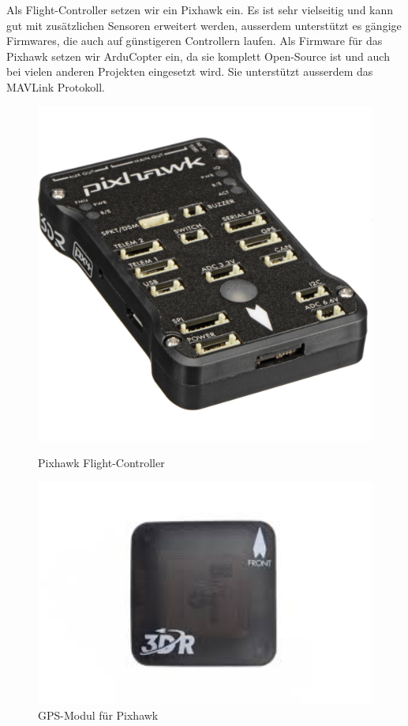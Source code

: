 Als Flight-Controller setzen wir ein Pixhawk ein. Es ist sehr vielseitig und kann gut mit zusätzlichen Sensoren erweitert werden, ausserdem unterstützt es gängige Firmwares, die auch auf günstigeren Controllern laufen. Als Firmware für das Pixhawk setzen wir ArduCopter ein, da sie komplett Open-Source ist und auch bei vielen anderen Projekten eingesetzt wird. Sie unterstützt ausserdem das \Gls{MAVLink} Protokoll.
\begin{figure}[H]
		\centering
	\begin{minipage}[b]{0.45\textwidth}
		\centering
		\includegraphics[width=1.0\textwidth] {images/hardware/pixhawk.jpg}
		\caption{Pixhawk Flight-Controller}
		\label{fig:pixhawk}
	\end{minipage}
	\hfill
	\begin{minipage}[b]{0.45\textwidth}
		\centering
		\includegraphics[width=1.0\textwidth] {images/hardware/gps-module.jpg}
		\caption{GPS-Modul für Pixhawk}
		\label{fig:gps-module}
	\end{minipage}
\end{figure}
